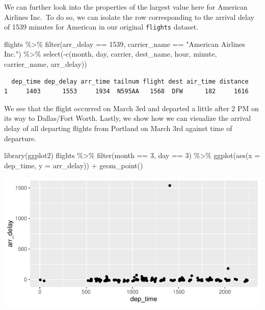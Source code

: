 \documentclass [11pt, proquest] {uwthesis}[2015/03/03]
\newenvironment{Shaded}{\begin{snugshade}}{\end{snugshade}}
\newcommand{\AttributeTok}[1]{\textcolor[rgb]{0.77,0.63,0.00}{#1}}
\newcommand{\DecValTok}[1]{\textcolor[rgb]{0.00,0.00,0.81}{#1}}
\newcommand{\FunctionTok}[1]{\textcolor[rgb]{0.00,0.00,0.00}{#1}}
\newcommand{\NormalTok}[1]{#1}
\newcommand{\SpecialCharTok}[1]{\textcolor[rgb]{0.00,0.00,0.00}{#1}}
\newcommand{\StringTok}[1]{\textcolor[rgb]{0.31,0.60,0.02}{#1}}
\begin{document}
We can further look into the properties of the largest value here for American Airlines Inc.~To do so, we can isolate the row corresponding to the arrival delay of 1539 minutes for American in our original \texttt{flights} dataset.
\begin{Shaded}
\begin{Highlighting}[]
\NormalTok{flights }\SpecialCharTok{\%\textgreater{}\%} 
  \FunctionTok{filter}\NormalTok{(arr\_delay }\SpecialCharTok{==} \DecValTok{1539}\NormalTok{, }
\NormalTok{         carrier\_name }\SpecialCharTok{==} \StringTok{"American Airlines Inc."}\NormalTok{) }\SpecialCharTok{\%\textgreater{}\%}
  \FunctionTok{select}\NormalTok{(}\SpecialCharTok{{-}}\FunctionTok{c}\NormalTok{(month, day, carrier, dest\_name, hour, }
\NormalTok{            minute, carrier\_name, arr\_delay))}
\end{Highlighting}
\end{Shaded}
\begin{verbatim}
  dep_time dep_delay arr_time tailnum flight dest air_time distance
1     1403      1553     1934  N595AA   1568  DFW      182     1616
\end{verbatim}
We see that the flight occurred on March 3rd and departed a little after 2 PM on its way to Dallas/Fort Worth. Lastly, we show how we can visualize the arrival delay of all departing flights from Portland on March 3rd against time of departure.
\begin{Shaded}
\begin{Highlighting}[]
\FunctionTok{library}\NormalTok{(ggplot2)}
\NormalTok{flights }\SpecialCharTok{\%\textgreater{}\%} 
  \FunctionTok{filter}\NormalTok{(month }\SpecialCharTok{==} \DecValTok{3}\NormalTok{, day }\SpecialCharTok{==} \DecValTok{3}\NormalTok{) }\SpecialCharTok{\%\textgreater{}\%}
  \FunctionTok{ggplot}\NormalTok{(}\FunctionTok{aes}\NormalTok{(}\AttributeTok{x =}\NormalTok{ dep\_time, }
             \AttributeTok{y =}\NormalTok{ arr\_delay)) }\SpecialCharTok{+} 
  \FunctionTok{geom\_point}\NormalTok{()}
\end{Highlighting}
\end{Shaded}
\includegraphics{thesis_files/figure-latex/march3plot-1.pdf}
\end{document}
